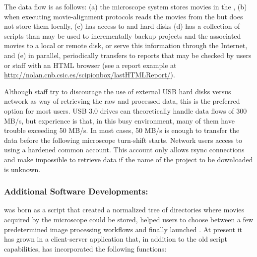 The data flow is as follows: (a) the microscope system stores movies in the \mnas, (b) when executing movie-alignment protocols \scipionbox reads the movies from the \mnas but does not store them locally, (c) \onas has access to \mnas and \scipionbox hard disks (d) \onas has a collection of scripts than may be used to incrementally backup \scipion projects and the associated movies to a local or remote disk, or serve this information through the Internet, and (e) in parallel, periodically \scipionbox transfers to  \hserver reports that may be checked by users or staff with an HTML browser (see a report example at \url{http://nolan.cnb.csic.es/scipionbox/lastHTMLReport/}).  

Although \cnb staff try to discourage the use of external USB hard disks versus network as way of retrieving the raw and processed data, this is the preferred option for most users.
USB 3.0 drives can theoretically handle data flows of 300 MB/s, but \cnb experience is that, in this busy environment, many of them  have trouble exceeding 50 MB/s. In most cases, 50 MB/s is enough to transfer the data before the following microscope  turn-shift starts. %
Network users access to \onas using a hardened common account. This account only allows rsync connections and make impossible to retrieve data if the name of the project to be downloaded is unknown. %

\subsubsection{Additional Software Developments: \emadmin}

\emadmin was born as a script that created a normalized tree of directories  
where movies acquired by the microscope could be stored, helped users to choose between a few predetermined image processing workflows and finally launched \scipion. At present it has grown in a client-server application that, in addition to the old script capabilities, has incorporated the following functions:

